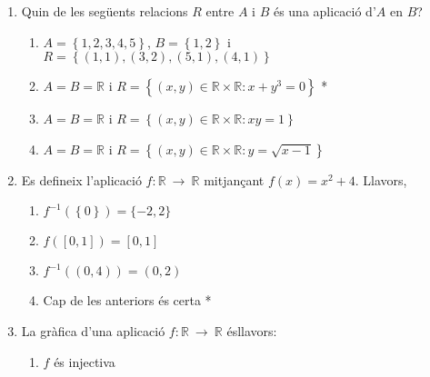 

\begin{enumerate}
\item Quin de les seg\"{u}ents relacions $R$ entre $A$ i $B$ \'{e}s una
aplicaci\'{o} d'$A$ en $B$?

\begin{enumerate}
\item $A=\left\{ 1,2,3,4,5\right\} $, $B=\left\{ 1,2\right\} $ i $R=\left\{
(1,1),(3,2),(5,1),(4,1)\right\} $

\item $A=B=\mathbb{R}$ i $R=\left\{ (x,y)\in \mathbb{R}\times \mathbb{R}%
:x+y^{3}=0\right\} $ *

\item $A=B=\mathbb{R}$ i $R=\left\{ (x,y)\in\mathbb{R}\times\mathbb{R}%
:xy=1\right\} $

\item $A=B=\mathbb{R}$ i $R=\left\{ (x,y)\in\mathbb{R}\times\mathbb{R}:y=%
\sqrt{x-1}\right\} $
\end{enumerate}

\item Es defineix l'aplicaci\'{o} $f:\mathbb{R}~\longrightarrow~\mathbb{R}$
mitjan\c{c}ant $f(x)=x^{2}+4$. Llavors,

\begin{enumerate}
\item $f^{-1}(\left\{ 0\right\} )=\{-2,2\}$

\item $f\left( [0,1]\right) =[0,1]$

\item $f^{-1}\left( (0,4)\right) =(0,2)$

\item Cap de les anteriors \'{e}s certa *
\end{enumerate}

\item La gr\`{a}fica d'una aplicaci\'{o} $f:\mathbb{R}~\longrightarrow~%
\mathbb{R}$ \'{e}sllavors:

\begin{enumerate}
\item $f$ \'{e}s injectiva


\end{enumerate}
\end{enumerate}
